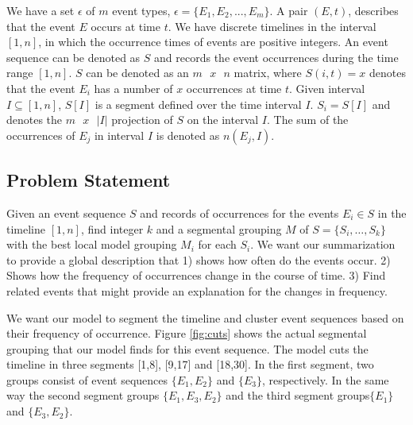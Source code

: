 We have a set $\epsilon$ of $m$ event types, $\epsilon=\{E_1,E_2,...,E_m\}$. A pair $(E,t)$, describes that the event $E$ occurs at time $t$. We have discrete timelines in the interval $[1,n]$, in which the occurrence times of events are positive integers. An event sequence can be denoted as $S$ and records the event occurrences during the time range $[1,n]$. $S$ can be denoted as an $m\text{ }x\text{ }n$ matrix, where $S(i,t)=x$ denotes that the event $E_i$ has a number of $x$ occurrences at time $t$. Given interval $I \subseteq [1,n]$, $S[I]$ is a segment defined over the time interval $I$. $S_i=S[I]$ and denotes the $m\text{ }x\text{ }|I|$ projection of $S$ on the interval $I$. The sum of the occurrences of $E_j$ in interval $I$ is denoted as $n(E_j,I)$.


\subsection{Problem Statement}

Given an event sequence $S$ and records of occurrences for the events $E_i \in S$ in the timeline $[1,n]$, find integer $k$ and a segmental grouping $M$ of $S=\{S_i,\dots,S_k\}$ with the best local model grouping $M_i$ for each $S_i$.
We want our summarization to provide a global description that 1) shows how often do the events occur. 2) Shows how the frequency of occurrences change in the course of time. 3) Find related events that might provide an explanation for the changes in frequency.

We want our model to segment the timeline and cluster event sequences based on their frequency of occurrence. Figure 
\ref{fig:cuts} 
shows the actual segmental grouping that our model finds for this event sequence. The model cuts the timeline in three segments [1,8], [9,17] and [18,30]. In the first segment, two groups consist of event sequences $\{E_1,E_2\}$ and $\{E_3\}$, respectively. In the same way the second segment groups $\{E_1,E_3,E_2\}$ and the third segment groups$\{E_1\}$ and $\{E_3,E_2\}$.

